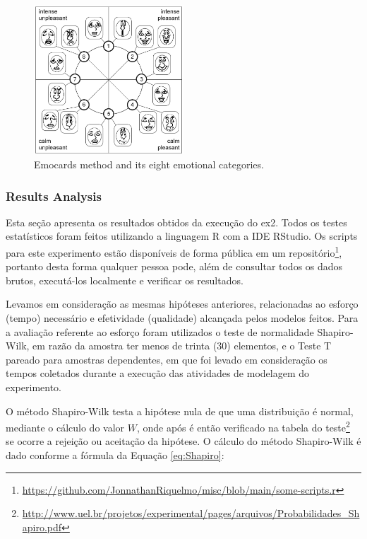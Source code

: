 \begin{figure}[!htb]
        \centering
        \caption{Emocards method and its eight emotional categories.}
        \label{fig:EmocardsMethod}
        \includegraphics[width=0.5\textwidth]{img/Emocards.png}
\end{figure}

\subsubsection{Results Analysis}

Esta seção apresenta os resultados obtidos da execução do \ac{ex2}.
Todos os testes estatísticos foram feitos utilizando a linguagem R com a IDE RStudio. 
Os scripts para este experimento estão disponíveis de forma pública em um repositório\footnote{\url{https://github.com/JonnathanRiquelmo/misc/blob/main/some-scripts.r}}, portanto desta forma qualquer pessoa pode, além de consultar todos os dados brutos, executá-los localmente e verificar os resultados.

Levamos em consideração as mesmas hipóteses anteriores, relacionadas ao esforço (tempo) necessário e efetividade (qualidade) alcançada pelos modelos feitos.
Para a avaliação referente ao esforço foram utilizados o teste de normalidade Shapiro-Wilk, em razão da amostra ter menos de trinta (30) elementos, e o Teste T pareado para amostras dependentes, em que foi levado em consideração os tempos coletados durante a execução das atividades de modelagem do experimento. 

O método Shapiro-Wilk testa a hipótese nula de que uma distribuição é normal, mediante o cálculo do valor $W$, onde após é então verificado na tabela do teste\footnote{\url{http://www.uel.br/projetos/experimental/pages/arquivos/Probabilidades\_Shapiro.pdf}} se ocorre a rejeição ou aceitação da hipótese. 
O cálculo do método Shapiro-Wilk é dado conforme a fórmula da Equação \ref{eq:Shapiro}: 

